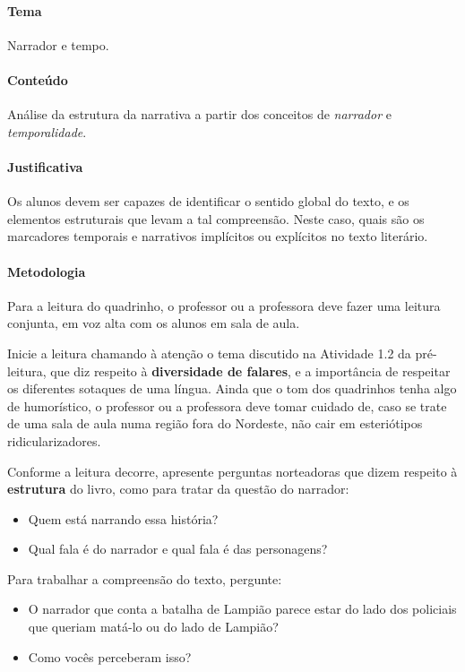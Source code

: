 \documentclass[11pt]{extarticle}
\begin{document}
\paragraph{Tema} Narrador e tempo.


\paragraph{Conteúdo} Análise da estrutura da narrativa a partir dos conceitos de \textit{narrador} e \textit{temporalidade}.


\paragraph{Justificativa} Os alunos devem ser capazes de identificar o sentido global do texto,
e os elementos estruturais que levam a tal compreensão. Neste caso, quais são os marcadores temporais 
e narrativos implícitos ou explícitos no texto literário. 


\paragraph{Metodologia} Para a leitura do quadrinho, o professor ou a professora deve fazer uma leitura conjunta, 
em voz alta com os alunos em sala de aula.


Inicie a leitura chamando à atenção o tema discutido na Atividade 1.2 da pré-leitura,
que diz respeito à \textbf{diversidade de falares}, e a importância de respeitar os
diferentes sotaques de uma língua. Ainda que o tom dos quadrinhos tenha algo de humorístico,
o professor ou a professora deve tomar cuidado de, caso se trate de uma sala de aula
numa região fora do Nordeste, não cair em esteriótipos ridicularizadores.

Conforme a leitura decorre, apresente perguntas norteadoras que dizem respeito à \textbf{estrutura}
do livro, como para tratar da questão do narrador:

\begin{itemize}
\item Quem está narrando essa história? 
\item Qual fala é do narrador e qual fala é das personagens?
\end{itemize}

Para trabalhar a compreensão do texto, pergunte:

\begin{itemize}
\item O narrador que conta a batalha de Lampião parece estar do lado dos policiais que queriam matá-lo
ou do lado de Lampião? 
\item Como vocês perceberam isso?
\end{itemize}
\end{document}
